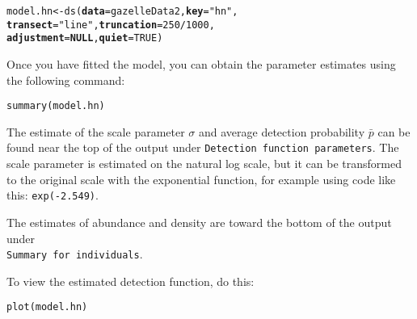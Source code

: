 \documentclass[12pt]{article}\usepackage[]{graphicx}\usepackage[]{color}
\makeatletter
\newcommand{\hlnum}[1]{\textcolor[rgb]{0.69,0.494,0}{#1}}%
\newcommand{\hlstr}[1]{\textcolor[rgb]{0.749,0.012,0.012}{#1}}%
\newcommand{\hlopt}[1]{\textcolor[rgb]{0,0,0}{#1}}%
\newcommand{\hlstd}[1]{\textcolor[rgb]{0,0,0}{#1}}%
\newcommand{\hlkwa}[1]{\textcolor[rgb]{0,0,0}{\textbf{#1}}}%
\newcommand{\hlkwb}[1]{\textcolor[rgb]{0,0.341,0.682}{#1}}%
\newcommand{\hlkwc}[1]{\textcolor[rgb]{0,0,0}{\textbf{#1}}}%
\newcommand{\hlkwd}[1]{\textcolor[rgb]{0.004,0.004,0.506}{#1}}%
\newenvironment{kframe}{%
 \def\at@end@of@kframe{}%
 \ifinner\ifhmode%
  \def\at@end@of@kframe{\end{minipage}}%
  \begin{minipage}{\columnwidth}%
 \fi\fi%
 \def\FrameCommand##1{\hskip\@totalleftmargin \hskip-\fboxsep
 \colorbox{shadecolor}{##1}\hskip-\fboxsep
     \hskip-\linewidth \hskip-\@totalleftmargin \hskip\columnwidth}%
 \MakeFramed {\advance\hsize-\width
   \@totalleftmargin\z@ \linewidth\hsize
   \@setminipage}}%
 {\par\unskip\endMakeFramed%
 \at@end@of@kframe}
\newenvironment{knitrout}{}{} %
\newcommand{\inr}[1]{\colorbox{inlinecolor}{\texttt{#1}}}
\makeatother
\begin{document}
\begin{knitrout}
\color{fgcolor}\begin{kframe}
\begin{alltt}
\hlstd{model.hn} \hlkwb{<-} \hlkwd{ds}\hlstd{(}\hlkwc{data}\hlstd{=gazelleData2,} \hlkwc{key}\hlstd{=}\hlstr{"hn"}\hlstd{,}
               \hlkwc{transect}\hlstd{=}\hlstr{"line"}\hlstd{,} \hlkwc{truncation}\hlstd{=}\hlnum{250}\hlopt{/}\hlnum{1000}\hlstd{,}
               \hlkwc{adjustment}\hlstd{=}\hlkwa{NULL}\hlstd{,} \hlkwc{quiet}\hlstd{=}\hlnum{TRUE}\hlstd{)}
\end{alltt}
\end{kframe}
\end{knitrout}


Once you have fitted the model, you can obtain the parameter estimates
using the following command:

\begin{knitrout}
\color{fgcolor}\begin{kframe}
\begin{alltt}
\hlkwd{summary}\hlstd{(model.hn)}
\end{alltt}
\end{kframe}
\end{knitrout}

The estimate of the scale parameter $\sigma$ and average detection
probability $\bar{p}$ can be found near the top of the output under
\verb+Detection function parameters+. The scale parameter is estimated
on the natural log scale, but it can be transformed to the original
scale with the exponential function, for example using code like this:
\inr{exp(-2.549)}. 

The estimates of abundance and density are toward the bottom of the
output under \\
\verb+Summary for individuals+.
 

To view the estimated detection function, do this:

\begin{knitrout}
\color{fgcolor}\begin{kframe}
\begin{alltt}
\hlkwd{plot}\hlstd{(model.hn)}
\end{alltt}
\end{kframe}
\end{knitrout}


\clearpage
\end{document}
